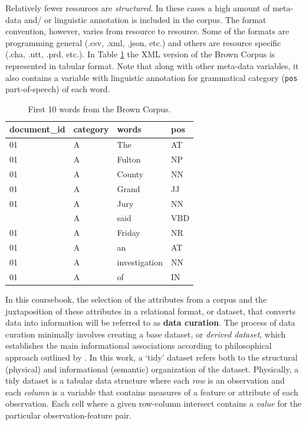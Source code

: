 \documentclass[
]{article}
\begin{document}
Relatively fewer resources are \emph{structured}. In these cases a high amount of meta-data and/ or linguistic annotation is included in the corpus. The format convention, however, varies from resource to resource. Some of the formats are programming general (.csv, .xml, .json, etc.) and others are resource specific (.cha, .utt, .prd, etc.). In Table \ref{tab:structure-brown} the XML version of the Brown Corpus is represented in tabular format. Note that along with other meta-data variables, it also contains a variable with linguistic annotation for grammatical category (\texttt{pos} part-of-speech) of each word.

\begin{table}

\caption{\label{tab:structure-brown}First 10 words from the Brown Corpus.}
\centering
\begin{tabular}[t]{llll}
\toprule
document\_id & category & words & pos\\
\midrule
01 & A & The & AT\\
01 & A & Fulton & NP\\
01 & A & County & NN\\
01 & A & Grand & JJ\\
01 & A & Jury & NN\\
\addlinespace
01 & A & said & VBD\\
01 & A & Friday & NR\\
01 & A & an & AT\\
01 & A & investigation & NN\\
01 & A & of & IN\\
\bottomrule
\end{tabular}
\end{table}

In this coursebook, the selection of the attributes from a corpus and the juxtaposition of these attributes in a relational format, or dataset, that converts data into information will be referred to as \textbf{data curation}. The process of data curation minimally involves creating a base dataset, or \emph{derived dataset}, which establishes the main informational associations according to philosophical approach outlined by \citet{Wickham2014a}. In this work, a `tidy' dataset refers both to the structural (physical) and informational (semantic) organization of the dataset. Physically, a tidy dataset is a tabular data structure where each \emph{row} is an observation and each \emph{column} is a variable that contains measures of a feature or attribute of each observation. Each cell where a given row-column intersect contains a \emph{value} for the particular observation-feature pair.
\end{document}
